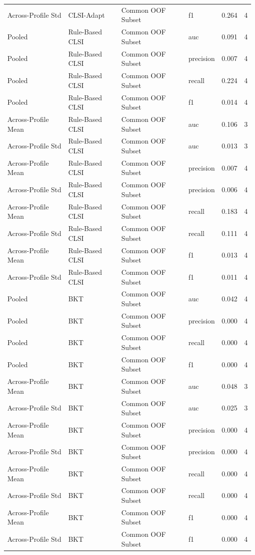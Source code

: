 \begin{table}[ht]
\begin{tabular}{llllll}
Across-Profile Std & CLSI-Adapt & Common OOF Subset & f1 & 0.264 & 4 \\
Pooled & Rule-Based CLSI & Common OOF Subset & auc & 0.091 & 4 \\
Pooled & Rule-Based CLSI & Common OOF Subset & precision & 0.007 & 4 \\
Pooled & Rule-Based CLSI & Common OOF Subset & recall & 0.224 & 4 \\
Pooled & Rule-Based CLSI & Common OOF Subset & f1 & 0.014 & 4 \\
Across-Profile Mean & Rule-Based CLSI & Common OOF Subset & auc & 0.106 & 3 \\
Across-Profile Std & Rule-Based CLSI & Common OOF Subset & auc & 0.013 & 3 \\
Across-Profile Mean & Rule-Based CLSI & Common OOF Subset & precision & 0.007 & 4 \\
Across-Profile Std & Rule-Based CLSI & Common OOF Subset & precision & 0.006 & 4 \\
Across-Profile Mean & Rule-Based CLSI & Common OOF Subset & recall & 0.183 & 4 \\
Across-Profile Std & Rule-Based CLSI & Common OOF Subset & recall & 0.111 & 4 \\
Across-Profile Mean & Rule-Based CLSI & Common OOF Subset & f1 & 0.013 & 4 \\
Across-Profile Std & Rule-Based CLSI & Common OOF Subset & f1 & 0.011 & 4 \\
Pooled & BKT & Common OOF Subset & auc & 0.042 & 4 \\
Pooled & BKT & Common OOF Subset & precision & 0.000 & 4 \\
Pooled & BKT & Common OOF Subset & recall & 0.000 & 4 \\
Pooled & BKT & Common OOF Subset & f1 & 0.000 & 4 \\
Across-Profile Mean & BKT & Common OOF Subset & auc & 0.048 & 3 \\
Across-Profile Std & BKT & Common OOF Subset & auc & 0.025 & 3 \\
Across-Profile Mean & BKT & Common OOF Subset & precision & 0.000 & 4 \\
Across-Profile Std & BKT & Common OOF Subset & precision & 0.000 & 4 \\
Across-Profile Mean & BKT & Common OOF Subset & recall & 0.000 & 4 \\
Across-Profile Std & BKT & Common OOF Subset & recall & 0.000 & 4 \\
Across-Profile Mean & BKT & Common OOF Subset & f1 & 0.000 & 4 \\
Across-Profile Std & BKT & Common OOF Subset & f1 & 0.000 & 4 \\
\bottomrule
\end{tabular}
\end{table}